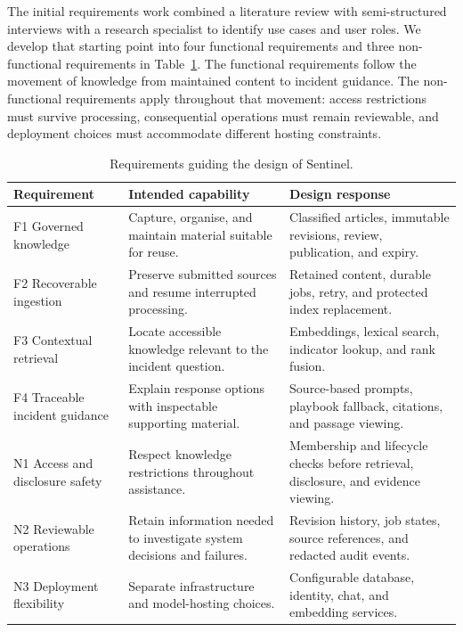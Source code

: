 The initial requirements work combined a literature review with semi-structured interviews with a research specialist to identify use cases and user roles. We develop that starting point into four functional requirements and three non-functional requirements in Table~\ref{tab:system-requirements}. The functional requirements follow the movement of knowledge from maintained content to incident guidance. The non-functional requirements apply throughout that movement: access restrictions must survive processing, consequential operations must remain reviewable, and deployment choices must accommodate different hosting constraints.

\begin{table}[htbp]
\centering\small
\caption{Requirements guiding the design of Sentinel.}
\label{tab:system-requirements}
\begin{tabularx}{\textwidth}{@{}>{\raggedright\arraybackslash}p{}XX@{}}
\toprule
\rowcolor{TableNavy}
\color{white}\bfseries Requirement & \color{white}\bfseries Intended capability & \color{white}\bfseries Design response \\
\midrule
\rowcolor{TableStripe}
F1 Governed knowledge & Capture, organise, and maintain material suitable for reuse. & Classified articles, immutable revisions, review, publication, and expiry. \\
F2 Recoverable ingestion & Preserve submitted sources and resume interrupted processing. & Retained content, durable jobs, retry, and protected index replacement. \\
\rowcolor{TableStripe}
F3 Contextual retrieval & Locate accessible knowledge relevant to the incident question. & Embeddings, lexical search, indicator lookup, and rank fusion. \\
F4 Traceable incident guidance & Explain response options with inspectable supporting material. & Source-based prompts, playbook fallback, citations, and passage viewing. \\
\rowcolor{TableStripe}
N1 Access and disclosure safety & Respect knowledge restrictions throughout assistance. & Membership and lifecycle checks before retrieval, disclosure, and evidence viewing. \\
N2 Reviewable operations & Retain information needed to investigate system decisions and failures. & Revision history, job states, source references, and redacted audit events. \\
\rowcolor{TableStripe}
N3 Deployment flexibility & Separate infrastructure and model-hosting choices. & Configurable database, identity, chat, and embedding services. \\
\bottomrule
\end{tabularx}
\end{table}


